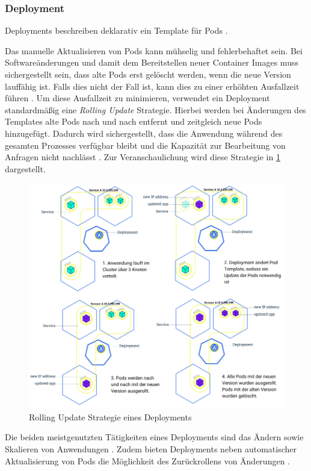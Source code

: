 \subsubsection{Deployment}
\label{subsec:kubernetes:deployment}
Deployments beschreiben deklarativ ein Template für Pods \cite{kubernetesDeployments}. 

Das manuelle Aktualisieren von Pods kann mühselig und fehlerbehaftet sein. Bei Softwareänderungen und damit dem
Bereitstellen neuer Container Images muss sichergestellt sein, dass alte Pods erst gelöscht werden, wenn die neue Version
lauffähig ist. Falls dies nicht der Fall ist, kann dies zu einer erhöhten Ausfallzeit führen \cite{Marko2018}.
Um diese Ausfallzeit zu minimieren, verwendet ein Deployment standardmäßig eine \emph{Rolling Update} Strategie.
Hierbei werden bei Änderungen des Templates alte Pods nach und nach entfernt und zeitgleich neue Pods hinzugefügt.
Dadurch wird sichergestellt, dass die Anwendung während des gesamten Prozesses verfügbar bleibt und die Kapazität zur Bearbeitung
von Anfragen nicht nachlässt \cite{Marko2018}.
Zur Veranschaulichung wird diese Strategie in \ref{fig:kubernetes_rolling_update} dargestellt.

\begin{figure}
  \centering
  \includegraphics[width=\textwidth]{gfx/chapters/2_grundlagen/deployment_rollout.png}
  \caption{Rolling Update Strategie eines Deployments}
  \label{fig:kubernetes_rolling_update}
\end{figure}

Die beiden meistgenutzten Tätigkeiten eines Deployments sind das Ändern sowie Skalieren von Anwendungen \cite{Burns2019}.
Zudem bieten Deployments neben automatischer Aktualisierung von Pods die Möglichkeit des Zurückrollens von Änderungen \cite{kubernetesDeployments}.
